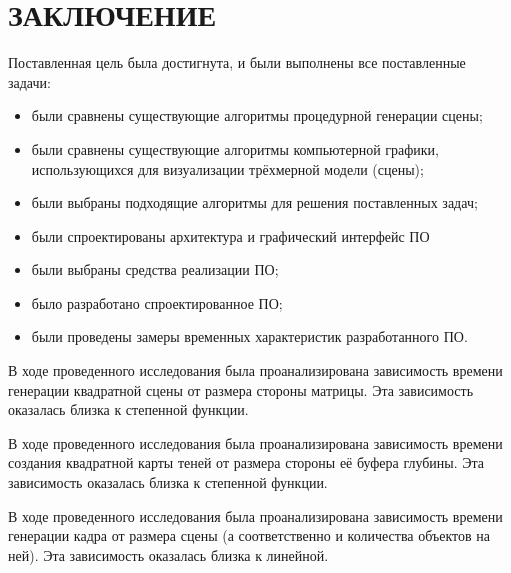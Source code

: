 \chapter{ЗАКЛЮЧЕНИЕ}

Поставленная цель была достигнута, и были выполнены все поставленные задачи:
\begin{itemize}
  \item были сравнены существующие алгоритмы процедурной генерации сцены;
  \item были сравнены существующие алгоритмы компьютерной графики, использующихся для визуализации трёхмерной модели (сцены);
  \item были выбраны подходящие алгоритмы для решения поставленных задач;
  \item были спроектированы архитектура и графический интерфейс ПО
  \item были выбраны средства реализации ПО;
  \item было разработано спроектированное ПО;
  \item были проведены замеры временных характеристик разработанного ПО.
\end{itemize}

В ходе проведенного исследования была проанализирована зависимость времени генерации квадратной сцены от размера стороны матрицы. Эта зависимость оказалась близка к степенной функции.

В ходе проведенного исследования была проанализирована зависимость времени создания квадратной карты теней от размера стороны её буфера глубины. Эта зависимость оказалась близка к степенной функции.

В ходе проведенного исследования была проанализирована зависимость времени генерации кадра от размера сцены (а соответственно и количества объектов на ней). Эта зависимость оказалась близка к линейной.
